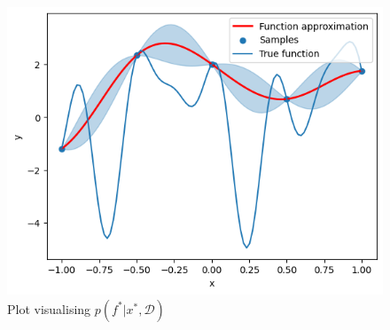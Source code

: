\begin{figure}[H]
\centering
\includegraphics[width=0.5\linewidth]{images/f_star.png}
\caption{Plot visualising $p(f^*|x^*, \mathcal{D})$}
\label{fig:f_star}
\end{figure}
